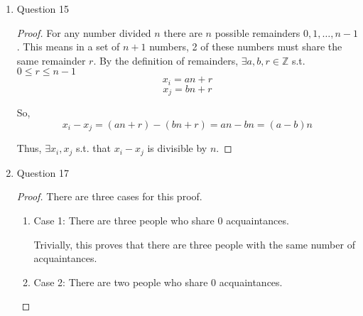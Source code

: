 \documentclass[12pt]{exam}
\begin{document}
\begin{enumerate}
\begin{proof}
Additionally because the student must work 1 hour a day and can only work more hours as the days pass, $$1 \le a_1 < a_2 < \cdots < a_{37} \le 60$$

We want to show that there is a sequence of days $j$ to $i$ such that the number of hours worked between $j, j + 1, \dots, i$ inclusive is $13$. In other words, we must prove $\exists i, j \in \mathbb{Z}_{\ge 0}$ s.t. $a_i = a_j + 13$ where $j \le i$. 

Consider the sequence of inequalities, $$14 \le a_1 + 13 < a_2 + 13 < \cdots < a_{37} + 13 \le 73$$

Between these 2 sequences, there are $37 \cdot 2 = 74$ numbers in the range of $1$ and $73$ inclusive. By the pigeonhole principle, there must be $2$ numbers that are equal. Clearly, these two numbers must cannot come from the same sequence because by the definition of each sequence, $a_i < a_{i + 1}$ and $a_i + 13 < a_{i + 1} + 13$. So clearly, there must be some $i, j$ such that $a_i = a_j + 13$. 

Thus, there exists a sequence of days where the student has studied exactly $13$ hours. 
\end{proof}

\item Question 15

\begin{proof}
For any number divided $n$ there are $n$ possible remainders $0, 1, \dots, n - 1$. This means in a set of $n + 1$ numbers, 2 of these numbers must share the same remainder $r$. By the definition of remainders, $\exists a, b, r \in \mathbb{Z}$ s.t. $0 \le r \le n - 1$  $$x_i = an + r$$ $$x_j = bn + r$$

So,
$$x_i - x_j = (an + r) - (bn + r) = an - bn = (a - b)n$$

Thus, $\exists x_i, x_j$ s.t. that $x_i - x_j$ is divisible by $n$.
\end{proof}

\item Question 17

\begin{proof}
There are three cases for this proof. 

\begin{enumerate}
    \item Case 1: There are three people who share 0 acquaintances. 
    
    Trivially, this proves that there are three people with the same number of acquaintances.
    
    \item Case 2: There are two people who share 0 acquaintances. 
    

\end{enumerate}
\end{proof}
\end{enumerate}
\end{document}
